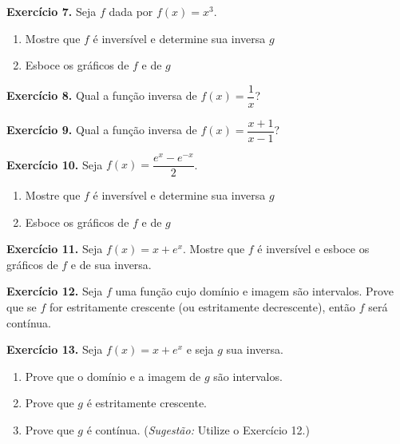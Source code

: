 \documentclass[12pt,a4paper]{article}
\begin{document}
\vspace{0.5cm}
\noindent\textbf{Exercício 7.} Seja $f$ dada por $f(x) = x^3$.
\begin{enumerate}
    \renewcommand{\theenumi}{\alph{enumi}}
    \renewcommand{\labelenumi}{\theenumi)}
    \item Mostre que $f$ é inversível e determine sua inversa $g$
    \item Esboce os gráficos de $f$ e de $g$
\end{enumerate}

\vspace{0.5cm}
\noindent\textbf{Exercício 8.}
Qual a função inversa de $f(x) = \dfrac{1}{x}$?

\vspace{0.5cm}
\noindent\textbf{Exercício 9.}
Qual a função inversa de $f(x) = \dfrac{x + 1}{x - 1}$?

\vspace{0.5cm}
\noindent\textbf{Exercício 10.} Seja $f(x) = \dfrac{e^x - e^{-x}}{2}$.
\begin{enumerate}
    \renewcommand{\theenumi}{\alph{enumi}}
    \renewcommand{\labelenumi}{\theenumi)}
    \item Mostre que $f$ é inversível e determine sua inversa $g$
    \item Esboce os gráficos de $f$ e de $g$
\end{enumerate}

\vspace{0.5cm}
\noindent\textbf{Exercício 11.}
Seja $f(x) = x + e^x$. Mostre que $f$ é inversível e esboce os gráficos de $f$ e de sua inversa.

\vspace{0.5cm}
\noindent\textbf{Exercício 12.}
Seja $f$ uma função cujo domínio e imagem são intervalos. Prove que se $f$ for estritamente crescente (ou estritamente decrescente), então $f$ será contínua.

\vspace{0.5cm}
\noindent\textbf{Exercício 13.} Seja $f(x) = x + e^x$ e seja $g$ sua inversa.
\begin{enumerate}
    \renewcommand{\theenumi}{\alph{enumi}}
    \renewcommand{\labelenumi}{\theenumi)}
    \item Prove que o domínio e a imagem de $g$ são intervalos.
    \item Prove que $g$ é estritamente crescente.
    \item Prove que $g$ é contínua. (\textit{Sugestão:} Utilize o Exercício 12.)
\end{enumerate}
\end{document}
